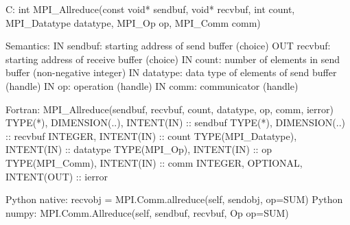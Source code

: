 C:
int MPI_Allreduce(const void* sendbuf,
  void* recvbuf, int count, MPI_Datatype datatype,
  MPI_Op op, MPI_Comm comm)

Semantics:
IN sendbuf: starting address of send buffer (choice)
OUT recvbuf: starting address of receive buffer (choice)
IN count: number of elements in send buffer (non-negative integer)
IN datatype: data type of elements of send buffer (handle)
IN op: operation (handle)
IN comm: communicator (handle)

Fortran:
MPI_Allreduce(sendbuf, recvbuf, count, datatype, op, comm, ierror)
TYPE(*), DIMENSION(..), INTENT(IN) :: sendbuf
TYPE(*), DIMENSION(..) :: recvbuf
INTEGER, INTENT(IN) :: count
TYPE(MPI_Datatype), INTENT(IN) :: datatype
TYPE(MPI_Op), INTENT(IN) :: op
TYPE(MPI_Comm), INTENT(IN) :: comm
INTEGER, OPTIONAL, INTENT(OUT) :: ierror


Python native:
recvobj = MPI.Comm.allreduce(self, sendobj, op=SUM)
Python numpy:
MPI.Comm.Allreduce(self, sendbuf, recvbuf, Op op=SUM)
